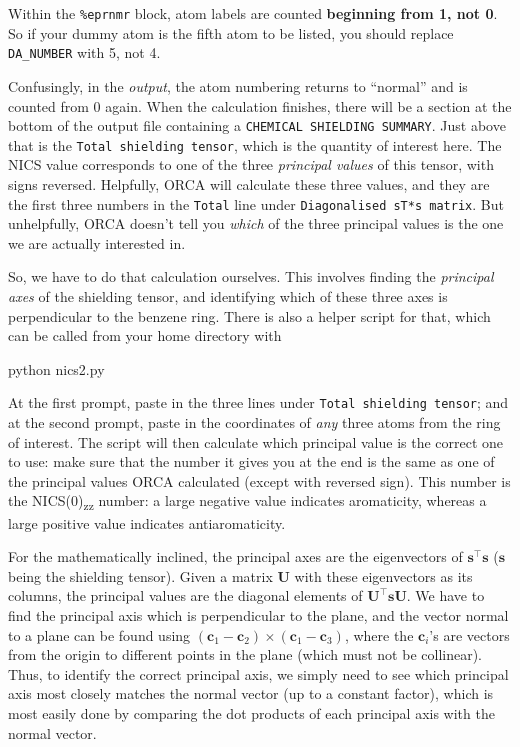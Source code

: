 \documentclass[10pt]{article}
\begin{document}
\begin{warning}
Within the \texttt{\%eprnmr} block, atom labels are counted \textbf{beginning from 1, not 0}. So if your dummy atom is the fifth atom to be listed, you should replace \texttt{DA\_NUMBER} with 5, not 4.
\end{warning}

Confusingly, in the \textit{output}, the atom numbering returns to ``normal'' and is counted from 0 again. When the calculation finishes, there will be a section at the bottom of the output file containing a \texttt{CHEMICAL SHIELDING SUMMARY}. Just above that is the \texttt{Total shielding tensor}, which is the quantity of interest here. The NICS value corresponds to one of the three \textit{principal values} of this tensor, with signs reversed. Helpfully, ORCA will calculate these three values, and they are the first three numbers in the \texttt{Total} line under \texttt{Diagonalised sT*s matrix}. But unhelpfully, ORCA doesn't tell you \textit{which} of the three principal values is the one we are actually interested in.

So, we have to do that calculation ourselves. This involves finding the \textit{principal axes} of the shielding tensor, and identifying which of these three axes is perpendicular to the benzene ring. There is also a helper script for that, which can be called from your home directory with

\begin{cmdline}
python nics2.py
\end{cmdline}

At the first prompt, paste in the three lines under \texttt{Total shielding tensor}; and at the second prompt, paste in the coordinates of \textit{any} three atoms from the ring of interest. The script will then calculate which principal value is the correct one to use: make sure that the number it gives you at the end is the same as one of the principal values ORCA calculated (except with reversed sign). This number is the NICS(0)\textsubscript{zz} number: a large negative value indicates aromaticity, whereas a large positive value indicates antiaromaticity.

For the mathematically inclined, the principal axes are the eigenvectors of \(\mathbf{s}^\intercal \mathbf{s}\) (\(\mathbf{s}\) being the shielding tensor). Given a matrix \(\mathbf{U}\) with these eigenvectors as its columns, the principal values are the diagonal elements of \(\mathbf{U^\intercal \mathbf{s} \mathbf{U}}\). We have to find the principal axis which is perpendicular to the plane, and the vector normal to a plane can be found using \((\mathbf{c}_1 - \mathbf{c}_2) \times (\mathbf{c}_1 - \mathbf{c}_3)\), where the \(\mathbf{c}_i\)'s are vectors from the origin to different points in the plane (which must not be collinear). Thus, to identify the correct principal axis, we simply need to see which principal axis most closely matches the normal vector (up to a constant factor), which is most easily done by comparing the dot products of each principal axis with the normal vector.

\printbibliography
\end{document}
